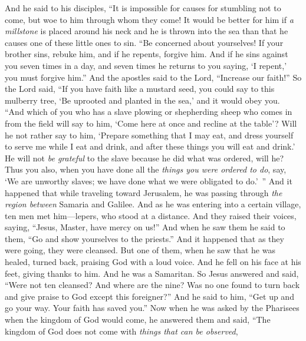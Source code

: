 \begin{biblechapter} %
 And he said to his disciples, “It is impossible for causes for stumbling not to come, but woe to him through whom they come!
\verse It would be better for him if \textit{a millstone} is placed around his neck and he is thrown into the sea than that he causes one of these little ones to sin.
\verse “Be concerned about yourselves! If your brother sins, rebuke him, and if he repents, forgive him.
\verse And if he sins against you seven times in a day, and seven times he returns to you saying, ‘I repent,’ you must forgive him.”
\verse And the apostles said to the Lord, “Increase our faith!”
\verse So the Lord said, “If you have faith like a mustard seed, you could say to this mulberry tree, ‘Be uprooted and planted in the sea,’ and it would obey you.
\verse “And which of you who has a slave plowing or shepherding sheep who comes in from the field will say to him, ‘Come here at once and recline at the table’?
\verse Will he not rather say to him, ‘Prepare something that I may eat, and dress yourself to serve me while I eat and drink, and after these things you will eat and drink.’
\verse He will not \textit{be grateful} to the slave because he did what was ordered, will he?
\verse Thus you also, when you have done all the \textit{things you were ordered to do}, say, ‘We are unworthy slaves; we have done what we were obligated to do.’ ”
 And it happened that while traveling toward Jerusalem, he was passing through \textit{the region between} Samaria and Galilee.
\verse And as he was entering into a certain village, ten men met him﻿—lepers, who stood at a distance.
\verse And they raised their voices, saying, “Jesus, Master, have mercy on us!”
\verse And when he saw them he said to them, “Go and show yourselves to the priests.” And it happened that as they were going, they were cleansed.
\verse But one of them, when he saw that he was healed, turned back, praising God with a loud voice.
\verse And he fell on his face at his feet, giving thanks to him. And he was a Samaritan.
\verse So Jesus answered and said, “Were not ten cleansed? And where are the nine?
\verse Was no one found to turn back and give praise to God except this foreigner?”
\verse And he said to him, “Get up and go your way. Your faith has saved you.”
 Now when he was asked by the Pharisees when the kingdom of God would come, he answered them and said, “The kingdom of God does not come with \textit{things that can be observed},

\end{biblechapter}

